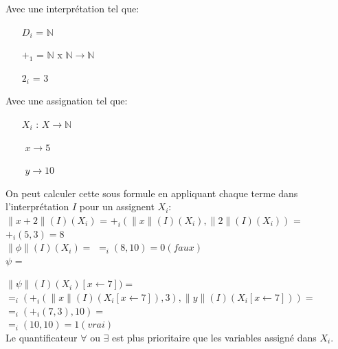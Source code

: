 Avec une interprétation tel que:
\begin{itemize}
\item[$D_i$] = $\mathbb{N}$
\item[$+_1$] = $\mathbb{N}$ x $\mathbb{N} \rightarrow \mathbb{N}$
\item[$2_i$] = $3$
\end{itemize}

Avec une assignation tel que:
\begin{itemize}
\item[$X_i$]: $X \rightarrow \mathbb{N}$
\item[$ $] $x \rightarrow 5$
\item[$ $] $y \rightarrow 10$
\end{itemize}

On peut calculer cette sous formule en appliquant chaque terme dans l'interprétation $I$ pour un assignent $X_i$:\\
$\| x + 2 \| (I)(X_i)$ = $+_i ( \| x \| (I)(X_i), \| 2 \| (I) (X_i))$ = $+_i (5,3) = 8$\\
$\| \phi \| (I)(X_i) =$ $ =_i(8,10) = 0 (faux)$\\


$\psi$ = \\

$\| \psi \| (I)(X_i)[x \leftarrow 7]) =$\\
$ =_i ( +_i (\| x\| (I)(X_i [x \leftarrow 7 ]), 3), \| y \| (I)(X_i[x \leftarrow 7])) = $\\
$ =_i ( +_i (7,3), 10) = $\\
$ =_i (10,10) = 1(vrai)$\\

Le quantificateur $\forall$ ou $\exists$ est plus prioritaire que les variables assigné dans $X_i$.\\

